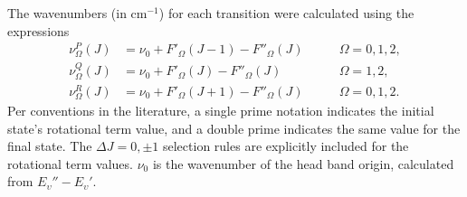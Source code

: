 The wavenumbers (in cm$^{-1}$) for each transition were calculated using the
expressions
\begin{align}
  \nu_{\Omega}^P(J) &= \nu_0 + F'_{\Omega}(J-1) - F''_{\Omega}(J) 
      \qquad & \Omega = 0,1,2, \\
  \nu_{\Omega}^Q(J) &= \nu_0 + F'_{\Omega}(J) - F''_{\Omega}(J)
     \qquad & \Omega = 1,2, \\
  \nu_{\Omega}^R(J) &= \nu_0 + F'_{\Omega}(J+1) - F''_{\Omega}(J) 
      \qquad & \Omega = 0,1,2.
\end{align}
Per conventions in the literature, a single prime notation indicates the initial
state's rotational term value, and a double prime indicates the same value for
the final state. The $\Delta J=0,\pm 1$ selection rules are explicitly included
for the rotational term values. $\nu_0$ is the wavenumber of the head band
origin, calculated from $E_\upsilon''-E_\upsilon'$.

